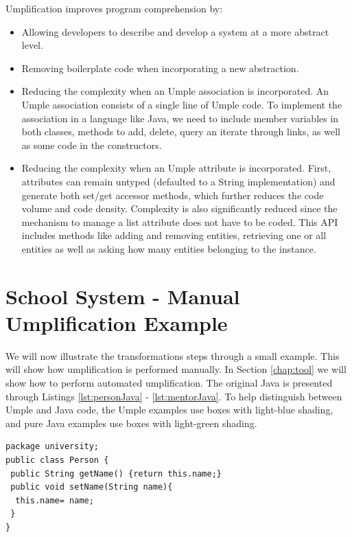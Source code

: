 Umplification improves program comprehension by:
\begin{itemize}
\item Allowing developers to describe and develop a system at a more abstract level.

\item Removing boilerplate code when incorporating a new abstraction.

\item Reducing the complexity when an Umple association is incorporated. An Umple association consists of a single line of Umple code. To implement the association in a language like Java, we need to include member variables in both classes, methods to add, delete, query an iterate through links, as well as some code in the constructors.

\item Reducing the complexity when an Umple attribute is incorporated. First, attributes can remain untyped (defaulted to a String implementation) and generate both set/get accessor methods, which further reduces the code volume and code density. Complexity is also significantly reduced since the mechanism to manage a list attribute does not have to be coded. This API includes methods like adding and removing entities, retrieving one or all entities as well as asking how many entities belonging to the instance.
\end{itemize}

\section{School System - Manual Umplification Example}
We will now illustrate the transformations steps through a small example. This will show how umplification is performed manually. In Section \ref{chap:tool} we will show how to perform automated umplification. The original Java is presented through Listings \ref{lst:personJava} - \ref{lst:mentorJava}.
To help distinguish between Umple and Java code, the Umple examples use boxes with {\color{blue} light-blue}  shading, and pure Java examples use boxes with {\color{green} light-green} shading.

\begin{lstlisting}[style=java,caption=Person.java,label=lst:personJava]
package university;
public class Person {
 public String getName() {return this.name;}
 public void setName(String name){
  this.name= name;
 }
}
\end{lstlisting}

